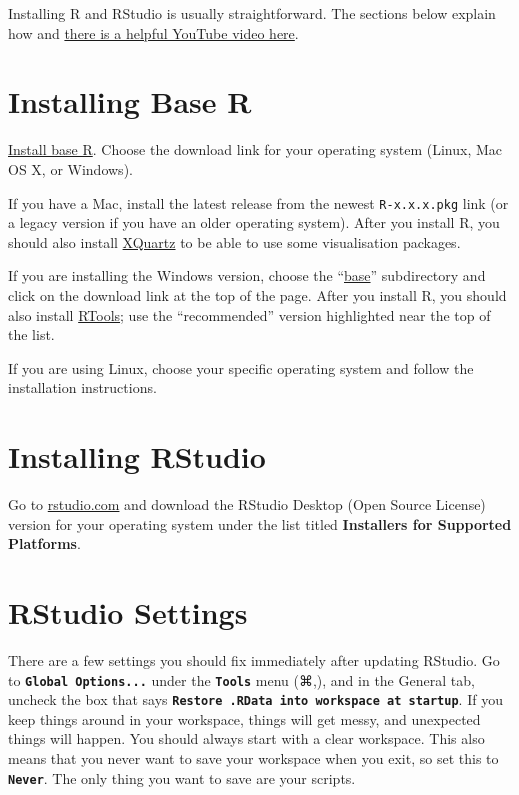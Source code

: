 \documentclass[
  oneside]{book}
\begin{document}
Installing R and RStudio is usually straightforward. The sections below explain how and \href{https://www.youtube.com/watch?v=lVKMsaWju8w}{there is a helpful YouTube video here}.

\hypertarget{installing-base-r}{%
\section{Installing Base R}\label{installing-base-r}}

\href{https://cran.rstudio.com/}{Install base R}. Choose the download link for your operating system (Linux, Mac OS X, or Windows).

If you have a Mac, install the latest release from the newest \texttt{R-x.x.x.pkg} link (or a legacy version if you have an older operating system). After you install R, you should also install \href{http://xquartz.macosforge.org/}{XQuartz} to be able to use some visualisation packages.

If you are installing the Windows version, choose the ``\href{https://cran.rstudio.com/bin/windows/base/}{base}'' subdirectory and click on the download link at the top of the page. After you install R, you should also install \href{https://cran.rstudio.com/bin/windows/Rtools/}{RTools}; use the ``recommended'' version highlighted near the top of the list.

If you are using Linux, choose your specific operating system and follow the installation instructions.

\hypertarget{installing-rstudio}{%
\section{Installing RStudio}\label{installing-rstudio}}

Go to \href{https://www.rstudio.com/products/rstudio/download/\#download}{rstudio.com} and download the RStudio Desktop (Open Source License) version for your operating system under the list titled \textbf{Installers for Supported Platforms}.

\hypertarget{rstudio-settings}{%
\section{RStudio Settings}\label{rstudio-settings}}

There are a few settings you should fix immediately after updating RStudio. Go to \textbf{\texttt{Global\ Options...}} under the \textbf{\texttt{Tools}} menu (⌘,), and in the General tab, uncheck the box that says \textbf{\texttt{Restore\ .RData\ into\ workspace\ at\ startup}}. If you keep things around in your workspace, things will get messy, and unexpected things will happen. You should always start with a clear workspace. This also means that you never want to save your workspace when you exit, so set this to \textbf{\texttt{Never}}. The only thing you want to save are your scripts.
\end{document}
